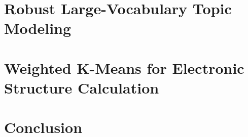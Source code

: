 \documentclass[phd,tocprelim]{cornell}
\begin{document}
\chapter{Robust Large-Vocabulary Topic Modeling}
	\label{ch5}
	

\chapter{Weighted K-Means for Electronic Structure Calculation}
	\label{ch6}
	

\chapter{Conclusion}
	\label{ch7}
	




\end{document}
